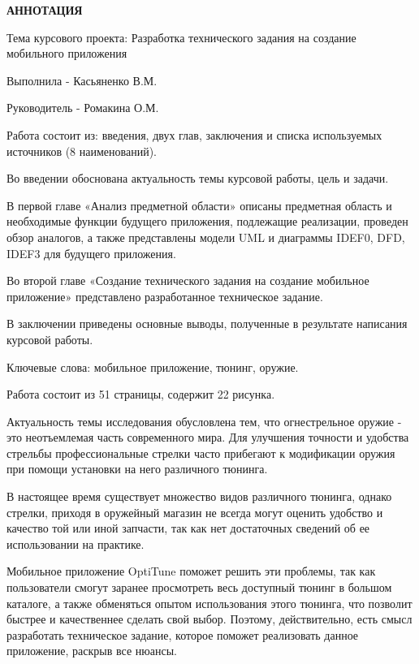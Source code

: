 \documentclass[14pt]{extreport}
\begin{document}
\pagestyle{empty} 


\pagestyle{plain}

\newpage
\begin{center}
\begin{normalsize}
\textbf{АННОТАЦИЯ}
\end{normalsize}
\end{center}

Тема курсового проекта: Разработка технического задания на создание мобильного приложения

Выполнила - Касьяненко В.М.

Руководитель - Ромакина О.М.

Работа состоит из: введения, двух глав, заключения и списка используемых источников (8 наименований).

Во введении обоснована актуальность темы курсовой работы, цель и задачи.

В первой главе «Анализ предметной области» описаны предметная область и необходимые функции будущего приложения, подлежащие реализации, проведен обзор аналогов, а также представлены модели UML и диаграммы IDEF0, DFD, IDEF3 для будущего приложения.

Во второй главе «Создание технического задания на создание мобильное приложение» представлено разработанное техническое задание.

В заключении приведены основные выводы, полученные в результате написания курсовой работы.

Ключевые слова: мобильное приложение, тюнинг, оружие.

Работа состоит из 51 страницы, содержит 22 рисунка.

\newpage
\tableofcontents

\intro 

Актуальность темы исследования обусловлена тем, что огнестрельное оружие - это неотъемлемая часть современного мира. Для улучшения точности и удобства стрельбы профессиональные стрелки часто прибегают к модификации оружия при помощи установки на него различного тюнинга. 

В настоящее время существует множество видов различного тюнинга, однако стрелки, приходя в оружейный магазин не всегда могут оценить удобство и качество той или иной запчасти, так как нет достаточных сведений об ее использовании на практике. 

Мобильное приложение OptiTune поможет решить эти проблемы, так как пользователи смогут заранее просмотреть весь доступный тюнинг в большом каталоге, а также обменяться опытом использования этого тюнинга, что позволит быстрее и качественнее сделать свой выбор. Поэтому, действительно, есть смысл разработать техническое задание, которое поможет реализовать данное приложение, раскрыв все нюансы.
\end{document}

